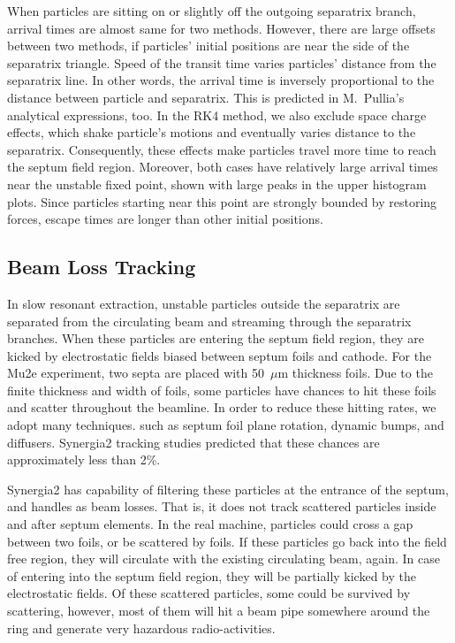 \documentclass[aps,prstab,onecolumn,preprint,endfloats,11pt]{revtex4-1}
\begin{document}
When particles are sitting on or slightly off the outgoing separatrix branch, arrival times are almost same for two methods. However, there are large offsets between two methods, if particles' initial positions are near the side of the separatrix triangle. Speed of the transit time varies particles' distance from the separatrix line. In other words, the arrival time is inversely proportional to the distance between particle and separatrix. This is predicted in M.~Pullia's analytical expressions, too. In the RK4 method, we also exclude space charge effects, which shake particle's motions and eventually varies distance to the separatrix. Consequently, these effects make particles travel more time to reach the septum field region. Moreover, both cases have relatively large arrival times near the unstable fixed point, shown with large peaks in the upper histogram plots. Since particles starting near this point are strongly bounded by restoring forces, escape times are longer than other initial positions. 


\subsection{\label{sec:beamloss}Beam Loss Tracking}

In slow resonant extraction, unstable particles outside the separatrix are separated from the circulating beam and streaming through the separatrix branches. When these particles are entering the septum field region, they are kicked by electrostatic fields biased between septum foils and cathode. For the Mu2e experiment, two septa are placed with 50~$\mu$m thickness foils. Due to the finite thickness and width of foils, some particles have chances to hit these foils and scatter throughout the beamline. In order to reduce these hitting rates, we adopt many techniques. such as septum foil plane rotation, dynamic bumps, and diffusers. Synergia2 tracking studies predicted that these chances are approximately less than 2\%. 

Synergia2 has capability of filtering these particles at the entrance of the septum, and handles as beam losses. That is, it does not track scattered particles inside and after septum elements. In the real machine, particles could cross a gap between two foils, or be scattered by foils. If these particles go back into the field free region, they will circulate with the existing circulating beam, again. In case of entering into the septum field region, they will be partially kicked by the electrostatic fields. Of these scattered particles, some could be survived by scattering, however, most of them will hit a beam pipe somewhere around the ring and generate very hazardous radio-activities.
\end{document}
